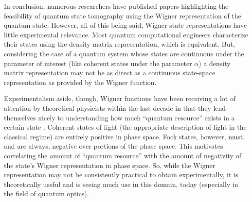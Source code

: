 In conclusion, numerous researchers have published papers highlighting the feasibility of quantum state tomography using the Wigner representation of the quantum state. However, all of this being said, Wigner state representations have little experimental relevance. Most quantum computational engineers characterize their states using the density matrix representation, which is equivalent. But, considering the case of a quantum system whose states are continuous under the parameter of interest (like coherent states under the parameter $\alpha$) a density matrix representation may not be as direct as a continuous state-space representation as provided by the Wigner function.

Experimentalism aside, though, Wigner functions have been receiving a lot of attention by theoretical physicists within the last decade in that they lend themselves nicely to understanding how much ``quantum resource'' exists in a certain state \cite{Veitch}.  Coherent states of light (the appropriate description of light in the classical regime) are entirely positive in phase space. Fock states, however, must, and are always, negative over portions of the phase space. This motivates correlating the amount of ``quantum resource'' with the amount of negativity of the state's Wigner representation in phase space. So, while the Wigner representation may not be consistently practical to obtain experimentally, it is theoretically useful and is seeing much use in this domain, today (especially in the field of quantum optics).